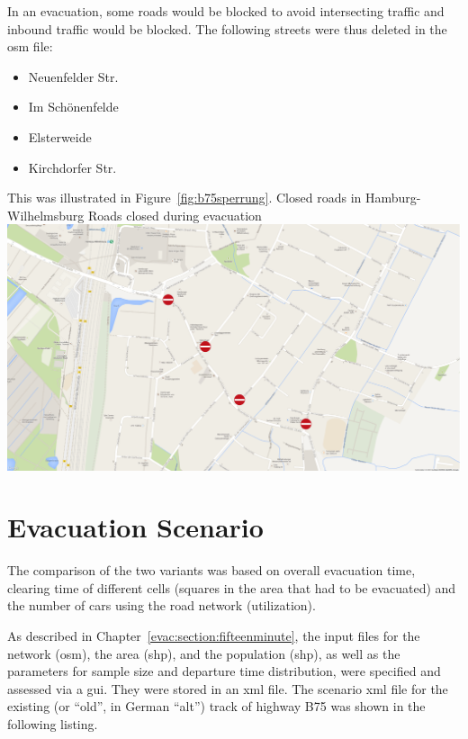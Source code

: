 In an evacuation, some roads would be blocked to avoid intersecting traffic and inbound traffic would be blocked. The following streets were thus deleted in the \gls{osm} file:
%
\begin{itemize}\styleItemize
	\item Neuenfelder Str. 
	\item Im Schönenfelde
	\item Elsterweide
	\item Kirchdorfer Str.
\end{itemize}
%
This was illustrated in Figure~\ref{fig:b75sperrung}.
%
%
\createfigure%
{Closed roads in Hamburg-Wilhelmsburg}%
{Roads closed during evacuation}%
{\label{fig:b75sperrung}}%
{\includegraphics[width=0.7\linewidth]{scenarios/figures/B75sperrung}}%
{}

\section{Evacuation Scenario}
The comparison of the two variants was based on overall evacuation time, clearing time of different cells (squares in the area that had to be evacuated) and the number of cars using the road network (utilization).

As described in Chapter~\ref{evac:section:fifteenminute}, the input files for the network (\gls{osm}), the area (shp), and the population (shp), as well as the parameters for sample size and departure time distribution, were specified and assessed via a \gls{gui}. They were stored in an \gls{xml} file. The scenario \gls{xml} file for the existing (or ``old'', in German ``alt'') track of highway B75 was shown in the following listing. 



